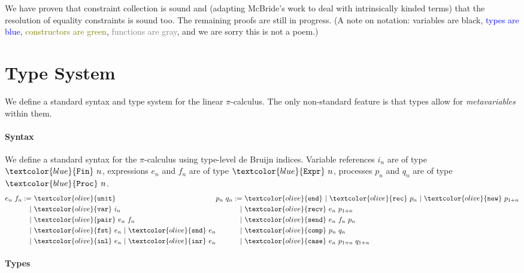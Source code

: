 \documentclass[sigplan,screen,review]{acmart}
\newcommand{\picalc}{$\pi$-calculus}
\newcommand{\constr}[1]{\textcolor{olive}{\mathtt{#1}}}
\newcommand{\type}[1]{\textcolor{blue}{\mathtt{#1}}}
\newcommand{\Fin}[1]{\type{Fin}~#1}
\newcommand{\sExpr}[1]{\type{Expr}~#1}
\newcommand{\sProc}[1]{\type{Proc}~#1}
\newcommand{\sunit}{\constr{unit}}
\newcommand{\svar}{\constr{var}}
\newcommand{\sfst}{\constr{fst}}
\newcommand{\ssnd}{\constr{snd}}
\newcommand{\sinl}{\constr{inl}}
\newcommand{\sinr}{\constr{inr}}
\newcommand{\spair}{\constr{pair}}
\newcommand{\send}{\constr{end}}
\newcommand{\snew}{\constr{new}}
\newcommand{\scomp}{\constr{comp}}
\newcommand{\srecv}{\constr{recv}}
\newcommand{\ssend}{\constr{send}}
\newcommand{\scase}{\constr{case}}
\newcommand{\srec}{\constr{rec}}
\begin{document}
We have proven that constraint collection is sound and (adapting McBride's work \cite{McBride03} to deal with intrinsically kinded terms) that the resolution of equality constraints is sound too.
The remaining proofs are still in progress.
(A note on notation: variables are black, \textcolor{blue}{types are blue}, \textcolor{olive}{constructors are green}, \textcolor{gray}{functions are gray}, and we are sorry this is not a poem.)


\section{Type System}
\label{type-system}

We define a standard syntax and type system for the linear \picalc{}.
The only non-standard feature is that types allow for \emph{metavariables} within them.

\paragraph{Syntax}

We define a standard syntax for the \picalc{} using type-level de Bruijn indices.
Variable references $i_n$ are of type $\Fin{n}$, expressions $e_n$ and $f_n$ are of type $\sExpr{n}$, processes $p_n$ and $q_n$ are of type $\sProc{n}$.
\[
\begin{aligned}[c]
  e_n ~ f_n  :=
  &~ \sunit \\
  |&~ \svar~i_n \\
  |&~ \spair~e_n~f_n \\
  |&~ \sfst~e_n ~|~  \ssnd~e_n \\
  |&~ \sinl~e_n ~|~  \sinr~e_n
\end{aligned}
\begin{aligned}[c]
  p_n ~ q_n  :=
  &~ \send ~|~  \srec~p_n ~|~ \snew~p_{1+n} \\
  |&~ \srecv~e_n~p_{1+n} \\
  |&~ \ssend~e_n~f_n~p_n \\
  |&~ \scomp~p_n~q_n \\
  |&~ \scase~e_n~p_{1+n}~q_{1+n} \\
\end{aligned}
\]

\paragraph{Types}
\label{types}
\end{document}
